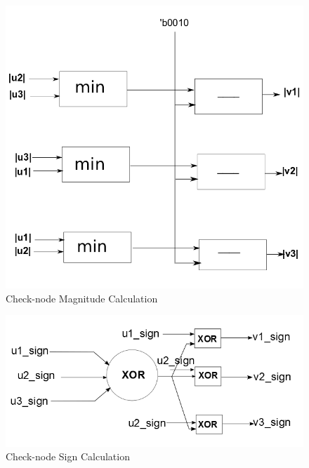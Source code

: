 \begin{figure} [H]
  \centering
  \includegraphics[scale=0.4]{./figs/check_node_mag}
  \caption{Check-node Magnitude Calculation}
  \label{check_node_mag}
\end{figure}

\begin{figure} [H]
  \centering
  \includegraphics[scale=0.4]{./figs/check_node_sign}
  \caption{Check-node Sign Calculation}
  \label{check_node_sign}
\end{figure}

